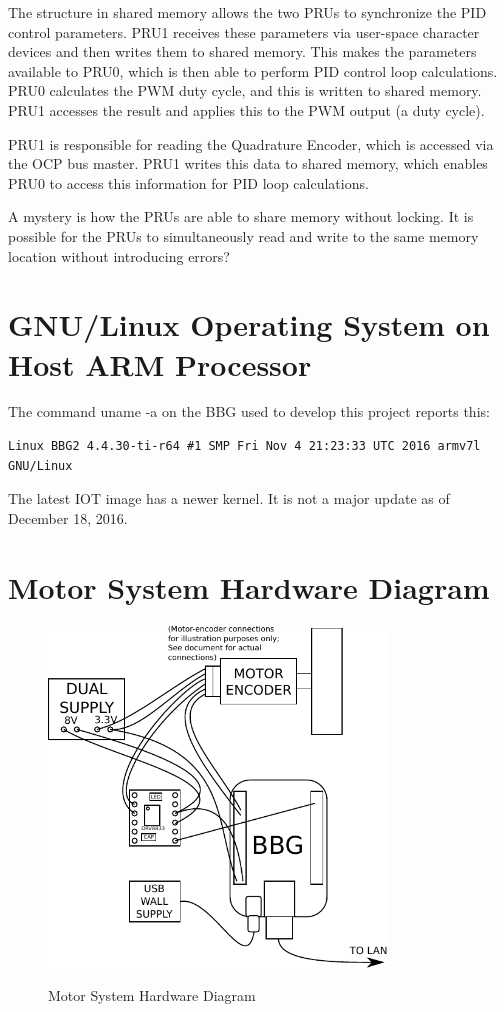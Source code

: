The structure in shared memory allows the two PRUs to synchronize the PID control parameters.  PRU1 receives these parameters via user-space character devices and then writes them to shared memory.  This makes the parameters available to PRU0, which is then able to perform PID control loop calculations.  PRU0 calculates the PWM duty cycle, and this is written to shared memory.  PRU1 accesses the result and applies this to the PWM output (a duty cycle).

PRU1 is responsible for reading the Quadrature Encoder, which is accessed via the OCP bus master.  PRU1 writes this data to shared memory, which enables PRU0 to access this information for PID loop calculations.

A mystery is how the PRUs are able to share memory without locking.  It is possible for the PRUs to simultaneously read and write to the same memory location without introducing errors?

\section{GNU/Linux Operating System on Host ARM Processor}

The command uname -a on the BBG used to develop this project reports this:

\begin{verbatim}
Linux BBG2 4.4.30-ti-r64 #1 SMP Fri Nov 4 21:23:33 UTC 2016 armv7l GNU/Linux
\end{verbatim}

The latest IOT image has a newer kernel.  It is not a major update as of December 18, 2016.

\section{Motor System Hardware Diagram}

\begin{figure}[H]
	\centering
	\includegraphics[width=0.8\textwidth]{diagrams/motor_system}
	\centering\bfseries
	\caption{Motor System Hardware Diagram}
\end{figure}

